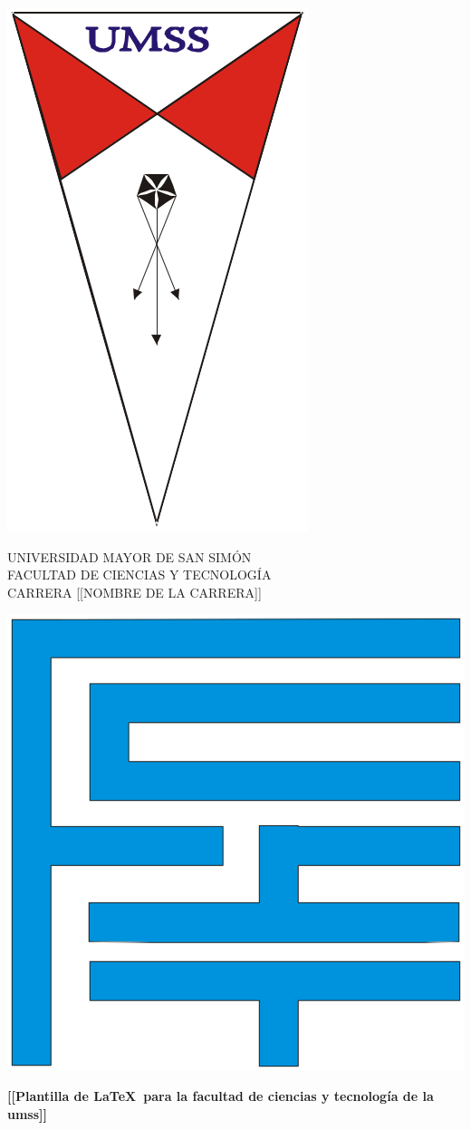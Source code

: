 \documentclass[
  12pt,                       %
  letterpapper,               %
  twoside,                    %
  openright                   %
]{book}                       %
\begin{document}
\begin{titlepage}

  \thispagestyle{empty}
  \parbox[c][.125\textheight]{.15\textwidth}{
    \includegraphics[height=.125\textheight]{umss-logo}
  }
  \hfill
  \parbox[c]{.5\textwidth}{
    \small
    UNIVERSIDAD MAYOR DE SAN SIMÓN \\
    FACULTAD DE CIENCIAS Y TECNOLOGÍA \\
    CARRERA [[NOMBRE DE LA CARRERA]]
  }
  \hfill
  \parbox[c]{.15\textwidth}{
    \includegraphics[width=.15\textwidth]{fcyt-logo}
  }

  \vspace{.1\textheight}
  \begin{center}
    \parbox[c]{.8\textwidth}{
      \centering\Large
      \textbf{[[Plantilla de \LaTeX\ para la facultad de ciencias y tecnología de la umss]]}
      \par
    }
  \end{center}


\end{titlepage}
\end{document}

